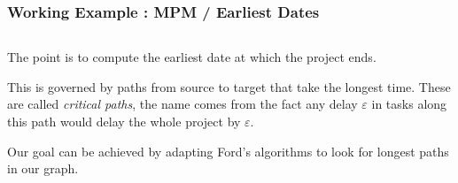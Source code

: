 \documentclass[32pt,aspectratio=169]{beamer}
\begin{document}
\begin{frame}
  \frametitle{Working Example : MPM / Earliest Dates}
  \begin{columns}
    \begin{column}{.6\textwidth}
      
      \vspace{.2\baselineskip}
      The point is to compute the earliest date at which the project
      ends. 
      
      \vspace{.3\baselineskip}
      This is governed by paths from source to target that take
      the longest time. These are called \emph{critical
        paths}, the name comes from the fact any delay $\varepsilon$
      in tasks along this path would delay the whole project by
      $\varepsilon$.

      \vspace{.3\baselineskip} 
      Our goal can be achieved by adapting Ford's algorithms to look
      for longest paths in our graph.
      

\end{column}
\end{columns}
\end{frame}
\end{document}
